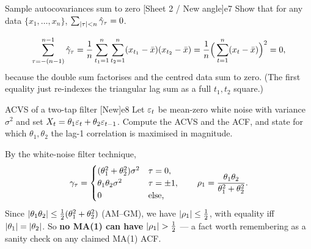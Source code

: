 \begin{exercise}{Sample autocovariances sum to zero \quad\textnormal{[Sheet 2 / New angle]}}{e7}
Show that for any data $\{x_1,\dots,x_n\}$, $\sum_{\left\lvert \tau \right\rvert<n}\hat{\gamma}_\tau=0$.
\end{exercise}
\begin{solution}
\[
\sum_{\tau=-(n-1)}^{n-1}\hat{\gamma}_\tau
=\frac1n\sum_{t_1=1}^n\sum_{t_2=1}^n(x_{t_1}-\bar x)(x_{t_2}-\bar x)
=\frac1n\Big(\sum_{t=1}^n(x_t-\bar x)\Big)^2=0,
\]
because the double sum factorises and the centred data sum to zero. (The first
equality just re-indexes the triangular lag sum as a full $t_1,t_2$ square.)
\end{solution}

\begin{exercise}{ACVS of a two-tap filter \quad\textnormal{[New]}}{e8}
Let $\varepsilon_t$ be mean-zero white noise with variance $\sigma^2$ and set
$X_t=\theta_1\varepsilon_t+\theta_2\varepsilon_{t-1}$. Compute the ACVS and the ACF, and state
for which $\theta_1,\theta_2$ the lag-1 correlation is maximised in magnitude.
\end{exercise}
\begin{solution}
By the white-noise filter technique,
\[
\gamma_\tau=\begin{cases}(\theta_1^2+\theta_2^2)\sigma^2 & \tau=0,\\
\theta_1\theta_2\sigma^2 & \tau=\pm1,\\ 0 &\text{else,}\end{cases}
\qquad
\rho_1=\frac{\theta_1\theta_2}{\theta_1^2+\theta_2^2}.
\]
Since $\left\lvert \theta_1\theta_2 \right\rvert\le\tfrac12(\theta_1^2+\theta_2^2)$ (AM--GM), we
have $\left\lvert \rho_1 \right\rvert\le\tfrac12$, with equality iff $\left\lvert \theta_1 \right\rvert=\left\lvert \theta_2 \right\rvert$.
So \textbf{no MA(1) can have $\left\lvert \rho_1 \right\rvert>\tfrac12$} --- a fact worth
remembering as a sanity check on any claimed MA(1) ACF.
\end{solution}
